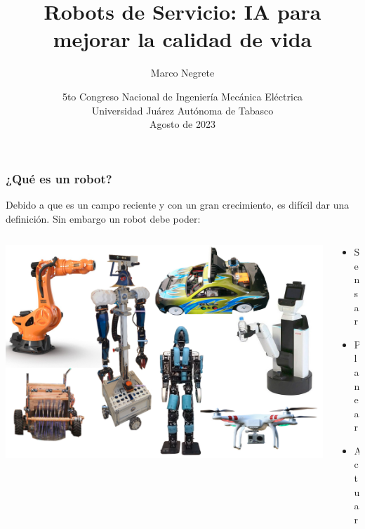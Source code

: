 \documentclass[10pt,spanish,aspectratio=1610]{beamer}
\begin{document}
\renewcommand{\tablename}{Tabla}
\renewcommand{\figurename}{Figura}
\title[IA en los Robots de Servicio]{Robots de Servicio: IA para mejorar la calidad de vida}
\author[Marco Negrete]{Marco Negrete}
\date[CNIME - 2023]{5to Congreso Nacional de Ingeniería Mecánica Eléctrica\\Universidad Juárez Autónoma de Tabasco\\Agosto de 2023}

\begin{frame}
\titlepage
\end{frame}

\begin{frame}\frametitle{¿Qué es un robot?}
  Debido a que es un campo reciente y con un gran crecimiento, es difícil dar una definición. Sin embargo un robot debe poder:
  \begin{columns}
    \begin{column}{0.75\textwidth}
      \includegraphics[width=\textwidth]{Figures/Robots.png}
    \end{column}
    \begin{column}{0.25\textwidth}
      \begin{itemize}
      \item Sensar
      \item Planear
      \item Actuar
      \end{itemize}
    \end{column}
  \end{columns}
\end{frame}
\end{document}
